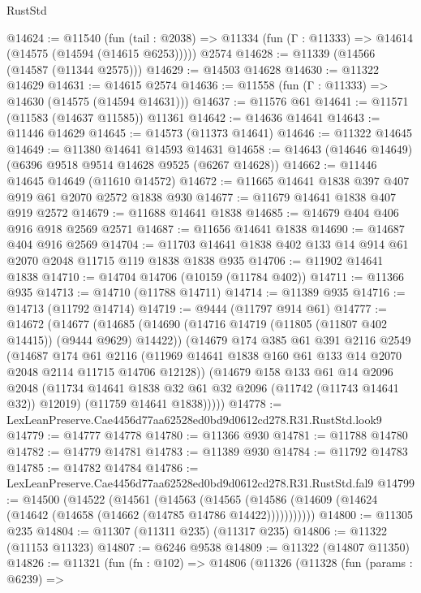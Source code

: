 \begin{lexlean}{RustStd}
\begin{coremodule}
@14624 := @11540
    (fun (tail : @2038) => @11334 (fun (Γ : @11333) => @14614 (@14575 (@14594 (@14615 @6253)))))
    @2574
@14628 := @11339 (@14566 (@14587 (@11344 @2575)))
@14629 := @14503 @14628
@14630 := @11322 @14629
@14631 := @14615 @2574
@14636 := @11558 (fun (Γ : @11333) => @14630 (@14575 (@14594 @14631)))
@14637 := @11576 @61
@14641 := @11571 (@11583 (@14637 @11585)) @11361
@14642 := @14636 @14641
@14643 := @11446 @14629
@14645 := @14573 (@11373 @14641)
@14646 := @11322 @14645
@14649 := @11380 @14641 @14593 @14631
@14658 := @14643 (@14646 @14649) (@6396 @9518 @9514 @14628 @9525 (@6267 @14628))
@14662 := @11446 @14645 @14649 (@11610 @14572)
@14672 := @11665 @14641 @1838 @397 @407 @919 @61 @2070 @2572 @1838 @930
@14677 := @11679 @14641 @1838 @407 @919 @2572
@14679 := @11688 @14641 @1838
@14685 := @14679 @404 @406 @916 @918 @2569 @2571
@14687 := @11656 @14641 @1838
@14690 := @14687 @404 @916 @2569
@14704 := @11703 @14641 @1838 @402 @133 @14 @914 @61 @2070 @2048 @11715 @119 @1838 @1838 @935
@14706 := @11902 @14641 @1838
@14710 := @14704 @14706 (@10159 (@11784 @402))
@14711 := @11366 @935
@14713 := @14710 (@11788 @14711)
@14714 := @11389 @935
@14716 := @14713 (@11792 @14714)
@14719 := @9444 (@11797 @914 @61)
@14777 := @14672
    (@14677
      (@14685
        (@14690 (@14716 @14719 (@11805 (@11807 @402 @14415)) (@9444 @9629) @14422))
        (@14679
          @174
          @385
          @61
          @391
          @2116
          @2549
          (@14687
            @174
            @61
            @2116
            (@11969 @14641 @1838 @160 @61 @133 @14 @2070 @2048 @2114 @11715 @14706 @12128))
          (@14679
            @158
            @133
            @61
            @14
            @2096
            @2048
            (@11734 @14641 @1838 @32 @61 @32 @2096 (@11742 (@11743 @14641 @32)) @12019)
            (@11759 @14641 @1838)))))
@14778 := LexLeanPreserve.Cae4456d77aa62528ed0bd9d0612cd278.R31.RustStd.look9
@14779 := @14777 @14778
@14780 := @11366 @930
@14781 := @11788 @14780
@14782 := @14779 @14781
@14783 := @11389 @930
@14784 := @11792 @14783
@14785 := @14782 @14784
@14786 := LexLeanPreserve.Cae4456d77aa62528ed0bd9d0612cd278.R31.RustStd.fal9
@14799 := @14500
    (@14522
      (@14561
        (@14563
          (@14565 (@14586 (@14609 (@14624 (@14642 (@14658 (@14662 (@14785 @14786 @14422)))))))))))
@14800 := @11305 @235
@14804 := @11307 (@11311 @235) (@11317 @235)
@14806 := @11322 (@11153 @11323)
@14807 := @6246 @9538
@14809 := @11322 (@14807 @11350)
@14826 := @11321
    (fun (fn : @102) =>
    @14806
      (@11326
        (@11328
          (fun (params : @6239) =>

\end{coremodule}
\end{lexlean}
